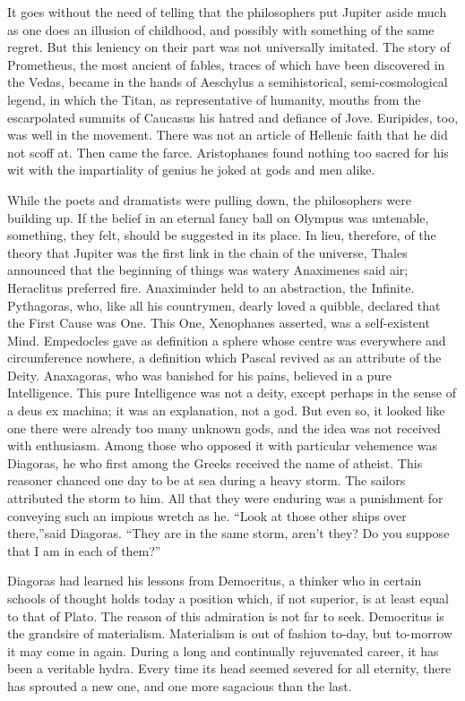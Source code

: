 \documentclass[]{book}
\begin{document}
It goes without the need of telling that the philosophers put Jupiter
aside much as one does an illusion of childhood, and possibly with
something of the same regret. But this leniency on their part was not
universally imitated. The story of Prometheus, the most ancient of
fables, traces of which have been discovered in the Vedas, became in the
hands of Aeschylus a semihistorical, semi-cosmological legend, in which
the Titan, as representative of humanity, mouths from the escarpolated
summits of Caucasus his hatred and defiance of Jove. Euripides, too, was
well in the movement. There was not an article of Hellenic faith that he
did not scoff at. Then came the farce. Aristophanes found nothing too
sacred for his wit with the impartiality of genius he joked at gods and
men alike.

While the poets and dramatists were pulling down, the philosophers were
building up. If the belief in an eternal fancy ball on Olympus was
untenable, something, they felt, should be suggested in its place. In
lieu, therefore, of the theory that Jupiter was the first link in the
chain of the universe, Thales announced that the beginning of things was
watery Anaximenes said air; Heraclitus preferred fire. Anaximinder held
to an abstraction, the Infinite. Pythagoras, who, like all his
countrymen, dearly loved a quibble, declared that the First Cause was
One. This One, Xenophanes asserted, was a self-existent Mind. Empedocles
gave as definition a sphere whose centre was everywhere and
circumference nowhere, a definition which Pascal revived as an attribute
of the Deity. Anaxagoras, who was banished for his pains, believed in a
pure Intelligence. This pure Intelligence was not a deity, except
perhaps in the sense of a deus ex machina; it was an explanation, not a
god. But even so, it looked like one there were already too many unknown
gods, and the idea was not received with enthusiasm. Among those who
opposed it with particular vehemence was Diagoras, he who first among
the Greeks received the name of atheist. This reasoner chanced one day
to be at sea during a heavy storm. The sailors attributed the storm to
him. All that they were enduring was a punishment for conveying such an
impious wretch as he. ``Look at those other ships over there,''said
Diagoras. ``They are in the same storm, aren't they? Do you suppose that
I am in each of them?''

Diagoras had learned his lessons from Democritus, a thinker who in
certain schools of thought holds today a position which, if not
superior, is at least equal to that of Plato. The reason of this
admiration is not far to seek. Democritus is the grandsire of
materialism. Materialism is out of fashion to-day, but to-morrow it may
come in again. During a long and continually rejuvenated career, it has
been a veritable hydra. Every time its head seemed severed for all
eternity, there has sprouted a new one, and one more sagacious than the
last.
\end{document}
